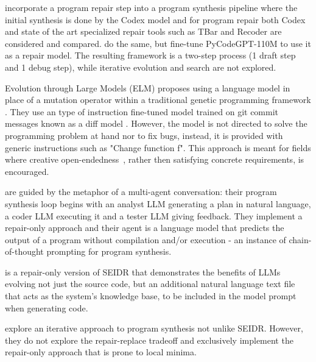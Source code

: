 \cite{fanAutomatedRepairPrograms2023} incorporate a program repair step into a program synthesis pipeline where the initial synthesis is done by the Codex model \cite{chen2021:evaluating} and for program repair both Codex and state of the art specialized repair tools such as TBar and Recoder \cite{Defects4JDatabaseExisting} are considered and compared. \cite{zhangSelfEditFaultAwareCode2023} do the same, but fine-tune PyCodeGPT-110M \cite{zanCERTContinualPretraining2022} to use it as a repair model. The resulting framework is a two-step process (1 draft step and 1 debug step), while iterative evolution and search are not explored. 

Evolution through Large Models (ELM) \cite{lehmanEvolutionLargeModels2022} proposes using a language model in place of a mutation operator within a traditional genetic programming framework \cite{koza1994:genetic}. They use an type of instruction fine-tuned model trained on git commit messages known as a diff model \cite{DiffModelsNew2023}. However, the model is not directed to solve the programming problem at hand nor to fix bugs, instead, it is provided with generic instructions such as "Change function f". This approach is meant for fields where creative open-endedness~\cite{stanleyWhyGreatnessCannot2015a}, rather then satisfying concrete requirements, is encouraged.

\cite{dongSelfcollaborationCodeGeneration2023} are guided by the metaphor of a multi-agent conversation: their program synthesis loop begins with an analyst LLM generating a plan in natural language, a coder LLM executing it and a tester LLM giving feedback. They implement a repair-only approach and their \execute{} agent is a language model that predicts the output of a program without compilation and/or execution - an instance of chain-of-thought prompting \cite{yuBetterChainofThoughtPrompting2023} for program synthesis.

\cite{jiangSelfEvolveCodeEvolution2023} is a repair-only version of SEIDR that demonstrates the benefits of LLMs evolving not just the source code, but an additional natural language text file that acts as the system's knowledge base, to be included in the model prompt when generating code.

\cite{xiaConversationalAutomatedProgram2023,chenTeachingLargeLanguage2023,shinnReflexionLanguageAgents2023} explore an iterative approach to program synthesis not unlike SEIDR. However, they do not explore the repair-replace tradeoff and exclusively implement the repair-only approach that is prone to local minima.

